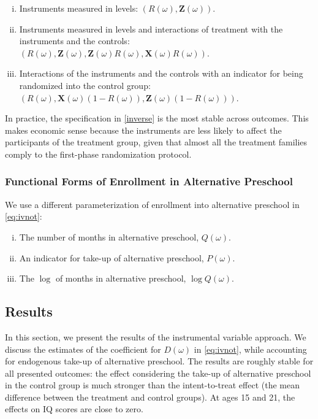 \begin{appendices}
\begin{enumerate}[(i)]
\item Instruments measured in levels: $ \left( R(\omega),\mathbf{Z}(\omega) \right) $.
\item\label{interact} Instruments measured in levels and interactions of treatment with the instruments and the controls: $ \left(R(\omega),\mathbf{Z}(\omega),\mathbf{Z}(\omega)R(\omega),\mathbf{X}(\omega)R(\omega) \right)$.
\item\label{inverse} Interactions of the instruments and the controls with an indicator for being randomized into the control group: $\left( R(\omega), \mathbf{X}(\omega) \left( 1-R(\omega) \right), \mathbf{Z}(\omega) \left( 1-R(\omega) \right) \right)$.
\end{enumerate}

\noindent In practice, the specification in \eqref{inverse} is the most stable across outcomes. This makes economic sense because the instruments are less likely to affect the participants of the treatment group, given that almost all the treatment families comply to the first-phase randomization protocol.

\subsubsection{Functional Forms of Enrollment in Alternative Preschool}

\noindent We use a different parameterization of enrollment into alternative preschool in \eqref{eq:ivnot}: 

\begin{enumerate}[(i)]
\item The number of months in alternative preschool, $Q(\omega)$.
\item An indicator for take-up of alternative preschool, $P(\omega)$.
\item The $\log$ of months in alternative preschool, $\log Q(\omega)$.
\end{enumerate}

\subsection{Results}

\noindent In this section, we present the results of the instrumental variable approach. We discuss the estimates of the coefficient for $D(\omega)$ in \eqref{eq:ivnot}, while accounting for endogenous take-up of alternative preschool. The results are roughly stable for all presented outcomes: the effect considering the take-up of alternative preschool in the control group is much stronger than the intent-to-treat effect (the mean difference between the treatment and control groups). At ages 15 and 21, the effects on IQ scores are close to zero.


\end{appendices}
